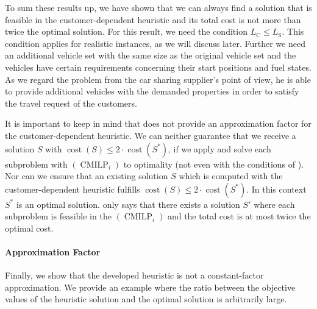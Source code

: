 To sum these results up, we have shown that we can always find a solution that is feasible in the customer-dependent heuristic and its total cost is not more than twice the optimal solution. For this result, we need the condition ${L_{\operatorname{C}}\leq L_{\operatorname{S}}}$. This condition applies for realistic instances, as we will discuss later. Further we need an additional vehicle set with the same size as the original vehicle set and the vehicles have certain requirements concerning their start positions and fuel states. As we regard the problem from the car sharing supplier's point of view, he is able to provide additional vehicles with the demanded properties in order to satisfy the travel request of the customers.

It is important to keep in mind that  does not provide an approximation factor for the customer-dependent heuristic. We can neither guarantee that we receive a solution $S$ with ${\operatorname{cost}\left(S\right)\leq 2\cdot\operatorname{cost}\left(S^*\right)}$, if we apply  and solve each subproblem with $(\operatorname{CMILP}_i)$ to optimality (not even with the conditions of ). Nor can we ensure that an existing solution $S$ which is computed with the customer-dependent heuristic fulfills ${\operatorname{cost}\left(S\right)\leq 2\cdot\operatorname{cost}\left(S^*\right)}$. In this context $S^*$ is an optimal solution.  only says that there exists a solution $S'$ where each subproblem is feasible in the $(\operatorname{CMILP}_i)$ and the total cost is at most twice the optimal cost.

\paragraph{Approximation Factor} \parfill

Finally, we show that the developed heuristic is not a constant-factor approximation. We provide an example where the ratio between the objective values of the heuristic solution and the optimal solution is arbitrarily large.

